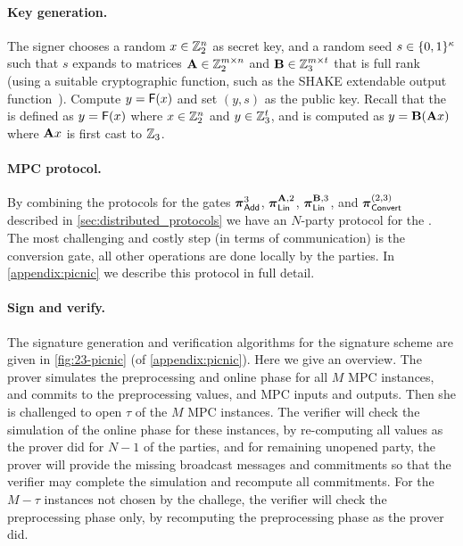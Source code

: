 \paragraph{Key generation.}
The signer chooses a random $x \in \mathbb{Z}_2^n$ as 
secret key, and a random seed $s \in \{0,1\}^{\kappa}$ such that $s$
expands to matrices $\mathbf{A} \in \mathbb{Z}_2^{m\times n}$ and $\mathbf{B}\in \mathbb{Z}_3^{m\times t}$ that is full rank (using a suitable cryptographic
function, such as the SHAKE extendable output function~\cite{sp800-185}).
Compute $y = \mathsf{F}(x)$ and set $(y, s)$ as the public key.
Recall that the \ttOWF is defined as $y = \mathsf{F}(x)$ where $x \in \mathbb{Z}_2^{n}$ and $y\in \mathbb{Z}_3^{t}$, and is computed as $y = \mat{B}(\mat{A}x)$ where $\mat{A}x$ is first cast to $\mathbb{Z}_3$. 

\paragraph{MPC protocol.}
By combining the protocols for the gates 
$\boldsymbol{\pi}_{\textnormal{\textsf{Add}}}^{3}$,
$\prot_{\LMap}^{\mat{A},2}$,
$\prot_{\LMap}^{\mat{B},3}$, and
$\boldsymbol{\pi}_{\textnormal{\textsf{Convert}}}^{(2,3)}$
described in \cref{sec:distributed_protocols} we have an $N$-party protocol for
the \ttOWF. The most challenging and costly step (in terms of communication) is
the conversion gate, all other operations are done locally by the parties.  In
\cref{appendix:picnic} we describe this protocol in full detail.  

\paragraph{Sign and verify.} 
The signature generation and verification algorithms for the
\ttOWF  signature scheme are given in \cref{fig:23-picnic} (of \cref{appendix:picnic}).
Here we give an overview. The
prover simulates the preprocessing and online phase for all $M$ MPC instances, and commits
to the preprocessing values, and MPC inputs and outputs.
Then she is challenged to open $\tau$ of the $M$ MPC instances.
The verifier will check the simulation of the online phase for these instances,
by re-computing all values as the prover did for $N-1$ of the parties, and for
remaining unopened party, the prover will provide the missing broadcast messages
and commitments so that the verifier may complete the simulation and recompute all
commitments. 
For the $M-\tau$ instances not chosen by the challege, the verifier will check
the preprocessing phase only, by recomputing the preprocessing phase as the prover did. 

